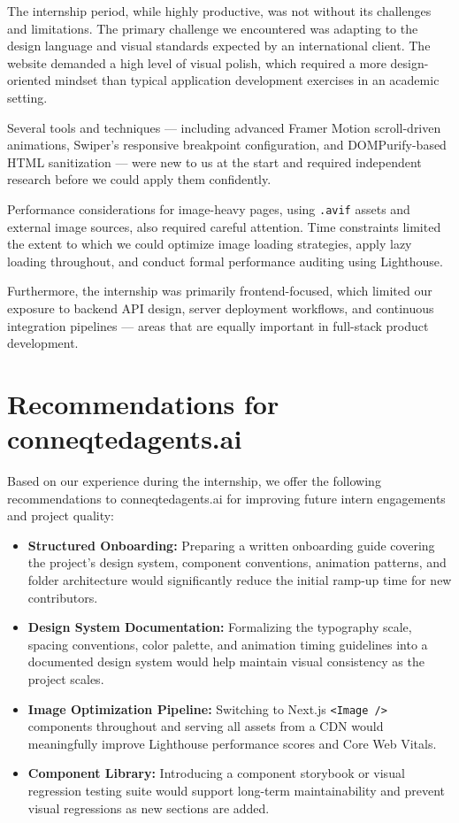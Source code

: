 \documentclass[12pt, oneside, a4paper]{book}
\begin{document}
\begin{doublespace}
The internship period, while highly productive, was not without its challenges and
limitations. The primary challenge we encountered was adapting to the design language
and visual standards expected by an international client. The website demanded a high
level of visual polish, which required a more design-oriented mindset than typical
application development exercises in an academic setting.

Several tools and techniques --- including advanced Framer Motion scroll-driven
animations, Swiper's responsive breakpoint configuration, and DOMPurify-based HTML
sanitization --- were new to us at the start and required independent research before
we could apply them confidently.

Performance considerations for image-heavy pages, using \texttt{.avif} assets and
external image sources, also required careful attention. Time constraints limited the
extent to which we could optimize image loading strategies, apply lazy loading
throughout, and conduct formal performance auditing using Lighthouse.

Furthermore, the internship was primarily frontend-focused, which limited our exposure
to backend API design, server deployment workflows, and continuous integration pipelines
--- areas that are equally important in full-stack product development.

\section{Recommendations for conneqtedagents.ai}

Based on our experience during the internship, we offer the following recommendations
to conneqtedagents.ai for improving future intern engagements and project quality:

\begin{itemize}
  \item \textbf{Structured Onboarding:} Preparing a written onboarding guide covering
  the project's design system, component conventions, animation patterns, and folder
  architecture would significantly reduce the initial ramp-up time for new contributors.
  \item \textbf{Design System Documentation:} Formalizing the typography scale, spacing
  conventions, color palette, and animation timing guidelines into a documented design
  system would help maintain visual consistency as the project scales.
  \item \textbf{Image Optimization Pipeline:} Switching to Next.js \texttt{<Image />}
  components throughout and serving all assets from a CDN would meaningfully improve
  Lighthouse performance scores and Core Web Vitals.
  \item \textbf{Component Library:} Introducing a component storybook or visual
  regression testing suite would support long-term maintainability and prevent visual
  regressions as new sections are added.
\end{itemize}


\end{doublespace}
\end{document}
